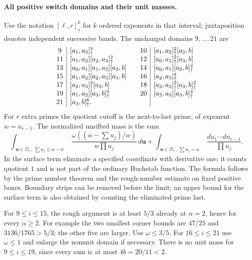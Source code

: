 \paragraph{All positive switch domains and their unit masses.}
Use the notation $[\ell,r]^k_\uparrow$ for $k$ ordered exponents
in that interval; juxtaposition denotes independent successive bands.
The unchanged domains $9,\ldots,21$ are
\[
\begin{array}{c|l@{\qquad}c|l}
9&[a_1,a_3]^3_\uparrow&10&[a_1,a_2]^2_\uparrow[a_2,b]\\
11&[a_1,a_2][a_2,a_3]^2_\uparrow&12&[a_0,a_1]^2_\uparrow[a_3,b]\\
13&[a_0,a_1][a_1,a_2][a_2,b]&14&[a_0,a_1][a_2,b]^2_\uparrow\\
15&[a_1,a_2][a_2,a_3][a_3,b]&16&[a_2,a_3]^4_\uparrow\\
17&[a_2,a_3]^3_\uparrow[a_3,b]&18&[a_2,a_3]^2_\uparrow[a_3,b]^2_\uparrow\\
19&[a_1,a_2][a_3,b]^3_\uparrow&20&[a_2,a_3][a_3,b]^4_\uparrow\\
21&[a_3,b]^6_\uparrow.&&
\end{array}
\]
For $r$ extra primes the quotient cutoff is the next-to-last prime,
of exponent $w=u_{r-1}$.  The normalized unsifted mass is the sum
\begin{equation}\label{eq:second-seed-full-mass}
 \int_{\substack{\boldsymbol u\in\mathcal D_i\,,\ \sum u_j\le\alpha-w}}
 \frac{\omega((\alpha-\sum u_j)/w)}{w\prod u_j}\,d\boldsymbol u
 +\int_{\substack{\boldsymbol u\in\mathcal D_i\,,\ \sum u_j=\alpha}}
             \frac{du_1\cdots du_{r-1}}{\prod u_j}.
\end{equation}
In the surface term eliminate a specified coordinate with derivative
one; it counts quotient $1$ and is not part of the ordinary Buchstab
function.  The formula follows by the prime number theorem and the
rough-number estimate on fixed positive boxes.  Boundary strips can
be removed before the limit; an upper bound for the surface term is
also obtained by counting the eliminated prime last.

For $9\le i\le15$, the rough argument is at least $5/3$ already at
$\alpha=2$, hence for every $\alpha\ge2$.
For example the two smallest corner bounds are $47/25$ and
$3136/1765>5/3$; the other five are larger.
Use $\omega\le3/5$.  For $16\le i\le21$ use $\omega\le1$ and
enlarge the nonunit domain if necessary.  There is no unit mass for
$9\le i\le19$, since every sum is at most $4b=20/11<2$.

